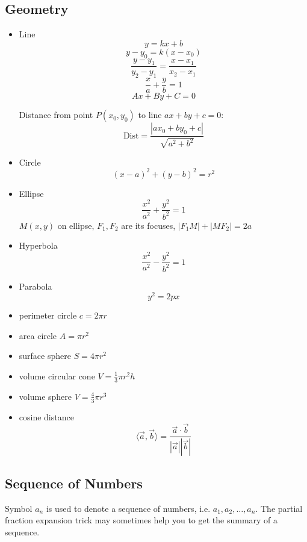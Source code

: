 \subsection{Geometry}

 \begin{itemize}
 \item{Line}\\
  \[ y = kx + b\]
  \[ y - y_0 = k(x - x_0) \]
  \[ \frac{y-y_1}{y_2-y_1} = \frac{x-x_1}{x_2-x_1}\]
  \[ \frac{x}{a} + \frac{y}{b} = 1 \]
  \[ Ax + By + C = 0\]
 
  Distance from point $P(x_0, y_0)$ to line $ax + by +c = 0$:
  \[ \text{Dist} = \frac{|ax_0 + by_0 +c|}{\sqrt{a^2+b^2}} \]
 \item{Circle}\\
  \[ (x-a)^2 + (y-b)^2 = r^2\]
 \item{Ellipse}\\
  \[ \frac{x^2}{a^2} + \frac{y^2}{b^2} = 1\]
  $M(x, y)$ on ellipse, $F_1, F_2$ are its focuses, $|F_1M|+|MF_2|= 2a$
 \item{Hyperbola}\\
  \[ \frac{x^2}{a^2} - \frac{y^2}{b^2} = 1\]
 \item{Parabola}\\
  \[ y^2 = 2px\]
 \item perimeter circle $c = 2 \pi r$ 
 \item area circle $A = \pi r^2$
 \item surface sphere $S = 4 \pi r^2$
 \item volume circular cone $V = \frac{1}{3} \pi r^2 h$
 \item volume sphere $V = \frac{4}{3} \pi r^3$
 \item cosine distance
  \[ \langle\vec{a},\vec{b}\rangle =
     \frac{\vec{a}\cdot\vec{b}}{|\vec{a}||\vec{b}|} \]
 \end{itemize}

\subsection{Sequence of Numbers}

 Symbol ${a_n}$ is used to denote a sequence of numbers,
 i.e. $a_1, a_2, \ldots, a_n$. The partial fraction expansion
 trick may sometimes help you to get the summary of a sequence.

